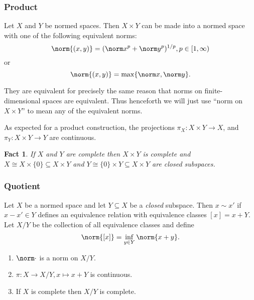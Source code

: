 \documentclass[a4paper]{article}
\newtheorem*{fact}{Fact}
\begin{document}
\subsubsection{Product}

\begin{definition}[product]
Let \(X\) and \(Y\) be normed spaces. Then \(X \times Y\) can be made into a normed space with one of the following equivalent norms:
\[
  \norm{(x, y)} = (\norm x^p + \norm y^p)^{1/p}, p \in [1, \infty)
\]
or
\[
  \norm{(x, y)} = \max \{\norm x, \norm y\}.
\]
\end{definition}

They are equivalent for precisely the same reason that norms on finite-dimensional spaces are equivalent. Thus henceforth we will just use ``norm on \(X \times Y\)'' to mean any of the equivalent norms.

As expected for a product construction, the projections \(\pi_X: X \times Y \to X\), and \(\pi_Y: X \times Y \to Y\) are continuous.

\begin{fact}
  If \(X\) and \(Y\) are complete then \(X \times Y\) is complete and \(X \cong X \times \{0\} \subseteq X \times Y\) and \(Y \cong \{0\} \times Y \subseteq X \times Y\) are closed subspaces.
\end{fact}

\subsubsection{Quotient}

\begin{definition}[quotient]
  Let \(X\) be a normed space and let \(Y \subseteq X\) be a \emph{closed} subspace. Then \(x \sim x'\) if \(x - x' \in Y\) defines an equivalence relation with equivalence classes \([x] = x + Y\). Let \(X / Y\) be the collection of all equivalence classes and define
  \[
    \norm{[x]} = \inf_{y \in Y} \norm{x + y}.
  \]
\end{definition}

\begin{proposition}\leavevmode
  \begin{enumerate}
  \item \(\norm \cdot\) is a norm on \(X / Y\).
  \item \(\pi: X \to X/Y, x \mapsto x + Y\) is continuous.
  \item If \(X\) is complete then \(X / Y\) is complete.
  \end{enumerate}
\end{proposition}
\end{document}
